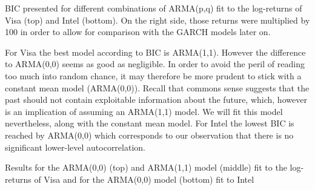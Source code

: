 \begin{table}[h!]
    \centering
    \small
    
    \caption{BIC presented for different combinations of ARMA(p,q) fit to the log-returns of Visa (top) and Intel (bottom). On the right side, those returns were multiplied by 100 in order to allow for comparison with the GARCH models later on.}
    \label{tab:bic_arma}
\end{table}{}

For Visa the best model according to BIC is ARMA(1,1). However the difference to ARMA(0,0) seems as good as negligible. In order to avoid the peril of reading too much into random chance, it may therefore be more prudent to stick with a constant mean model (ARMA(0,0)). Recall that commons sense suggests that the past should not contain exploitable information about the future, which, however is an implication of assuming an ARMA(1,1) model. We will fit this model nevertheless, along with the constant mean model. For Intel the lowest BIC is reached by ARMA(0,0) which corresponds to our observation that there is no significant lower-level autocorrelation. 

\begin{table}[h!]
    \centering
    \vspace{-2ex}
    \small
    
    \vspace{1ex}
    \vspace{-2ex}
    \small
    
    \vspace{1ex}
    \vspace{-2ex}
    \small
    
    \caption{Results for the ARMA(0,0) (top) and ARMA(1,1) model (middle) fit to the log-returns of Visa and for the ARMA(0,0) model (bottom) fit to Intel}
    \label{tab:ARMA_log_returns}
\end{table}

